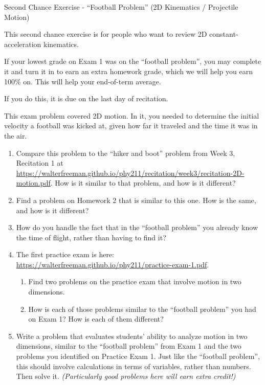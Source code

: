 \documentclass[12pt]{article}
\begin{document}
\begin{center}
\Large
\sc Second Chance Exercise - ``Football Problem'' (2D Kinematics / Projectile Motion)\rm





\normalsize
This second chance exercise is for people who want to review 2D constant-acceleration kinematics. 

If your lowest grade on Exam 1 was on the ``football problem'', you may complete it and turn it in to earn an extra homework grade, which we will help you earn 100\% on. This will help your end-of-term average.

If you do this, it is due on the last day of recitation.

\end{center}

\vspace{1.5in}

This exam problem covered 2D motion. In it, you needed to determine the initial velocity a football was kicked at, given how far it traveled and the time it was in the air.

\begin{enumerate}
	\item Compare this problem to the ``hiker and boot'' problem from Week 3, Recitation 1 at \url{https://walterfreeman.github.io/phy211/recitation/week3/recitation-2D-motion.pdf}. How is it similar to that problem, and how is it different?
	
	\item Find a problem on Homework 2 that is similar to this one. How is the same, and how is it different?
	
	\item How do you handle the fact that in the ``football problem'' you already know the time of flight, rather than having to find it?
	
	\item The first practice exam is here: \url{https://walterfreeman.github.io/phy211/practice-exam-1.pdf}. 
	\begin{enumerate}
		\item Find two problems on the practice exam that involve motion in two dimensions.
		\item How is each of those problems similar to the ``football problem'' you had on Exam 1? How is each of them different?
	\end{enumerate}
    \item Write a problem that evaluates students' ability to analyze motion in two dimensions, similar to the ``football problem'' from Exam 1 and the two problems you identified on Practice Exam 1. Just like the ``football problem'', this should involve calculations in terms of variables, rather than numbers. Then solve it. {\it (Particularly good problems here will earn extra credit!)}
\end{enumerate}
\end{document}
